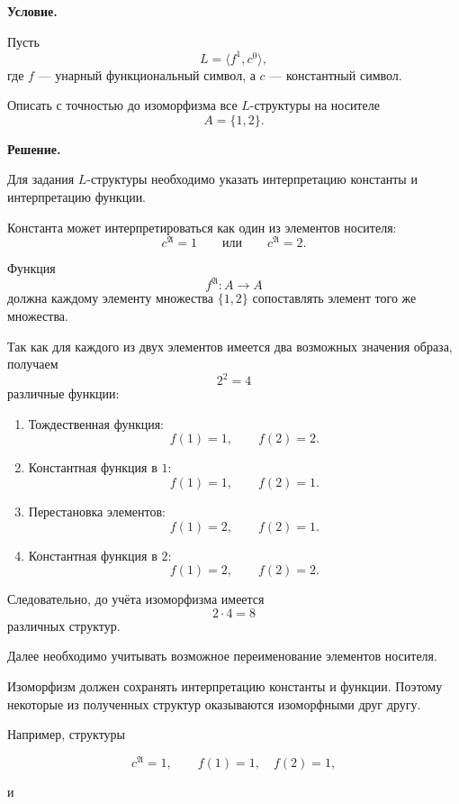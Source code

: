\documentclass[12pt,a4paper,oneside,openany]{book}
\theoremstyle{definition}
\theoremstyle{plain}
\theoremstyle{remark}
\begin{document}
\par\medskip
\textbf{Условие.}
\par\smallskip

Пусть
\[
L=\langle f^1,c^0\rangle,
\]
где $f$ — унарный функциональный символ, а $c$ — константный символ.

Описать с точностью до изоморфизма все $L$-структуры на носителе
\[
A=\{1,2\}.
\]

\par\medskip
\textbf{Решение.}
\par\smallskip

Для задания $L$-структуры необходимо указать интерпретацию константы и интерпретацию функции.

Константа может интерпретироваться как один из элементов носителя:
\[
c^{\mathfrak A}=1
\qquad \text{или} \qquad
c^{\mathfrak A}=2.
\]

Функция
\[
f^{\mathfrak A}:A\to A
\]
должна каждому элементу множества $\{1,2\}$ сопоставлять элемент того же множества.

Так как для каждого из двух элементов имеется два возможных значения образа, получаем
\[
2^2=4
\]
различные функции:

\begin{enumerate}
    \item Тождественная функция:
    \[
    f(1)=1,
    \qquad
    f(2)=2.
    \]

    \item Константная функция в $1$:
    \[
    f(1)=1,
    \qquad
    f(2)=1.
    \]

    \item Перестановка элементов:
    \[
    f(1)=2,
    \qquad
    f(2)=1.
    \]

    \item Константная функция в $2$:
    \[
    f(1)=2,
    \qquad
    f(2)=2.
    \]
\end{enumerate}

Следовательно, до учёта изоморфизма имеется
\[
2\cdot4=8
\]
различных структур.

Далее необходимо учитывать возможное переименование элементов носителя.

Изоморфизм должен сохранять интерпретацию константы и функции. Поэтому некоторые из полученных структур оказываются изоморфными друг другу.

Например, структуры

\[
c^{\mathfrak A}=1,
\qquad
f(1)=1,\quad f(2)=1,
\]

и
\end{document}
